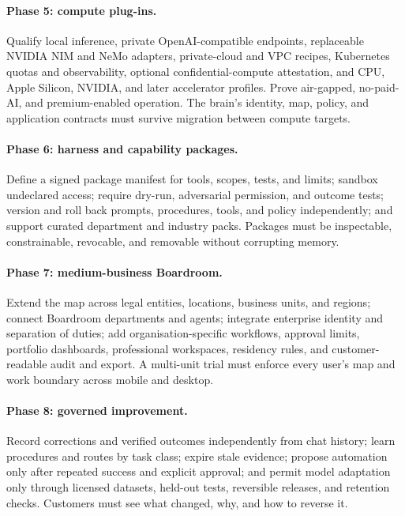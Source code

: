 \paragraph{Phase 5: compute plug-ins.}
Qualify local inference, private OpenAI-compatible endpoints, replaceable NVIDIA
NIM and NeMo adapters, private-cloud and VPC recipes, Kubernetes quotas and
observability, optional confidential-compute attestation, and CPU, Apple
Silicon, NVIDIA, and later accelerator profiles.  Prove air-gapped,
no-paid-AI, and premium-enabled operation.  The brain's identity, map, policy,
and application contracts must survive migration between compute targets.

\paragraph{Phase 6: harness and capability packages.}
Define a signed package manifest for tools, scopes, tests, and limits; sandbox
undeclared access; require dry-run, adversarial permission, and outcome tests;
version and roll back prompts, procedures, tools, and policy independently;
and support curated department and industry packs.  Packages must be
inspectable, constrainable, revocable, and removable without corrupting memory.

\paragraph{Phase 7: medium-business Boardroom.}
Extend the map across legal entities, locations, business units, and regions;
connect Boardroom departments and agents; integrate enterprise identity and
separation of duties; add organisation-specific workflows, approval limits,
portfolio dashboards, professional workspaces, residency rules, and customer-
readable audit and export.  A multi-unit trial must enforce every user's map
and work boundary across mobile and desktop.

\paragraph{Phase 8: governed improvement.}
Record corrections and verified outcomes independently from chat history;
learn procedures and routes by task class; expire stale evidence; propose
automation only after repeated success and explicit approval; and permit model
adaptation only through licensed datasets, held-out tests, reversible releases,
and retention checks.  Customers must see what changed, why, and how to reverse
it.

